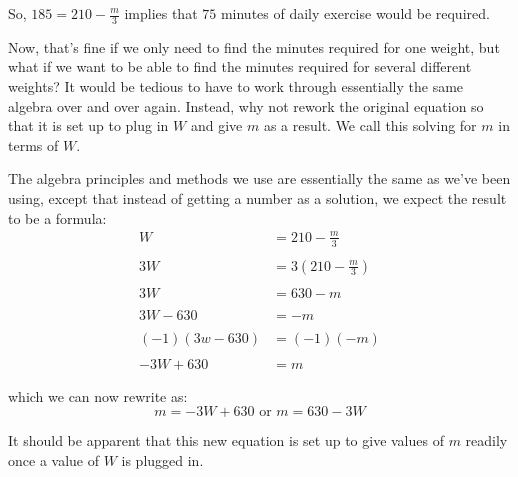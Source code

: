 So, $185=210-\frac{m}{3}$ implies that $75$ minutes of daily exercise would be required.

Now, that’s fine if we only need to find the minutes required for one weight, but what if we want to be able to find the minutes required for several different weights? It would be tedious to have to work through essentially the same algebra over and over again. Instead, why not rework the original equation so that it is set up to plug in $W$ and give $m$ as a result. We call this solving for $m$ in terms of $W$.

The algebra principles and methods we use are essentially the same as we’ve been using, except that instead of getting a number as a solution, we expect the result to be a formula:
\begin{align*}
	W&=210-\frac{m}{3} \\
	\\
	3W &= 3 \left(210 - \frac{m}{3}\right) \\
	\\
	3W &= 630 - m \\
	\\
	3W-630 &= -m \\
	\\
	(-1)(3w-630)&=(-1)(-m)\\
	\\
	-3W+630&=m
\end{align*}

which we can now rewrite as:
$$m=-3W+630 \text{ or } m=630-3W$$

It should be apparent that this new equation is set up to give values of $m$ readily once a value of $W$ is plugged in.



